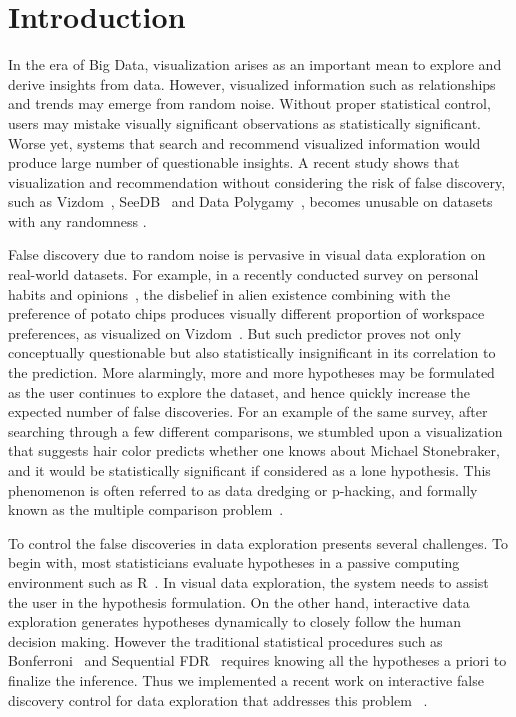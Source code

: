 \section{Introduction}
\label{sec:intro}
 In the era of Big Data, visualization arises as an important mean to explore and derive insights from data.  However, visualized information such as relationships and trends may emerge from random noise.  Without proper statistical control, users may mistake visually significant observations as statistically significant.  Worse yet, systems that search and recommend visualized information would produce large number of questionable insights.  
A recent study shows that visualization and recommendation without considering the risk of false discovery, such as Vizdom~\cite{vizdom}, SeeDB~\cite{seedb} and Data Polygamy~\cite{polygamy}, becomes unusable on datasets with any randomness \cite{towards-sustainable-insight}.

 False discovery due to random noise is pervasive in visual data exploration on real-world datasets. For example, in a recently conducted survey on personal habits and opinions~\cite{towards-sustainable-insight}, the disbelief in alien existence combining with the preference of potato chips produces visually different proportion of workspace preferences, as visualized on Vizdom~\cite{vizdom}.  But such predictor proves not only conceptually questionable but also statistically insignificant in its correlation to the prediction.  More alarmingly, more and more hypotheses may be formulated as the user continues to explore the dataset, and hence quickly increase the expected number of false discoveries. For an example of the same survey, after searching through a few different comparisons, we stumbled upon a visualization that suggests hair color predicts whether one knows about Michael Stonebraker, and it would be statistically significant if considered as a lone hypothesis. This phenomenon is often referred to as data dredging or p-hacking, and formally known as the multiple comparison problem~\cite{shaffer1995multiple}.

To control the false discoveries in data exploration presents several challenges.  To begin with, most statisticians evaluate hypotheses in a passive computing environment such as R~\cite{R}. In visual data exploration, the system needs to assist the user in the hypothesis formulation.  On the other hand, interactive data exploration generates hypotheses dynamically to closely follow the human decision making.  However the traditional statistical procedures such as Bonferroni~\cite{bonferroni1936teoria} and Sequential FDR~\cite{seq-fdr} requires knowing all the hypotheses a priori to finalize the inference.  Thus we implemented a recent work on interactive false discovery control for data exploration that addresses this problem ~\cite{controlling-false-discoveries}.  

